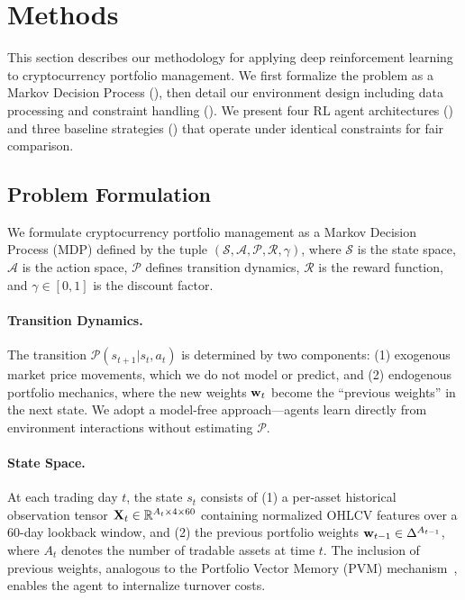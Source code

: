 
\section{Methods}
\label{sec:methods}

This section describes our methodology for applying deep reinforcement learning to cryptocurrency portfolio management. We first formalize the problem as a Markov Decision Process (), then detail our environment design including data processing and constraint handling (). We present four RL agent architectures () and three baseline strategies () that operate under identical constraints for fair comparison.

\subsection{Problem Formulation}
\label{sec:problem_formulation}

We formulate cryptocurrency portfolio management as a Markov Decision Process (MDP) defined by the tuple $(\mathcal{S}, \mathcal{A}, \mathcal{P}, \mathcal{R}, \gamma)$, where $\mathcal{S}$ is the state space, $\mathcal{A}$ is the action space, $\mathcal{P}$ defines transition dynamics, $\mathcal{R}$ is the reward function, and $\gamma \in [0,1]$ is the discount factor.

\paragraph{Transition Dynamics.} The transition $\mathcal{P}(s_{t+1}|s_t, a_t)$ is determined by two components: (1) exogenous market price movements, which we do not model or predict, and (2) endogenous portfolio mechanics, where the new weights $\mathbf{w}_t$ become the ``previous weights'' in the next state. We adopt a model-free approach---agents learn directly from environment interactions without estimating $\mathcal{P}$.

\paragraph{State Space.} At each trading day $t$, the state $s_t$ consists of (1) a per-asset historical observation tensor $\mathbf{X}_t \in \mathbb{R}^{A_t \times 4 \times 60}$ containing normalized OHLCV features over a 60-day lookback window, and (2) the previous portfolio weights $\mathbf{w}_{t-1} \in \Delta^{A_{t-1}}$, where $A_t$ denotes the number of tradable assets at time $t$. The inclusion of previous weights, analogous to the Portfolio Vector Memory (PVM) mechanism~\citep{jiang2017eIIE}, enables the agent to internalize turnover costs.

